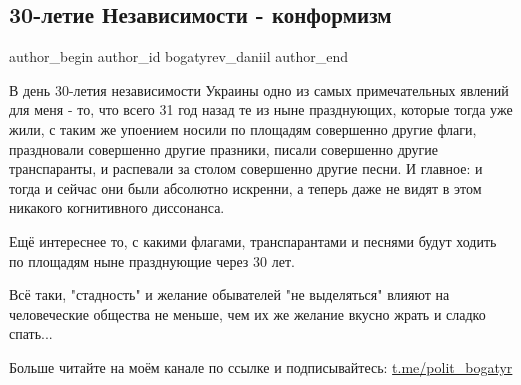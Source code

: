  
 
 
 
 
 
\subsection{30-летие Независимости - конформизм}
\label{sec:24_08_2021.fb.bogatyrev_daniil.1.konformizm_nezavisimost}
 
\ifcmt
 author_begin
   author_id bogatyrev_daniil
 author_end
\fi

В день 30-летия независимости Украины одно из самых примечательных явлений для
меня - то, что всего 31 год назад те из ныне празднующих, которые тогда уже
жили, с таким же упоением носили по площадям совершенно другие флаги,
праздновали совершенно другие празники, писали совершенно другие транспаранты,
и распевали за столом совершенно другие песни. И главное: и тогда и сейчас они
были абсолютно искренни, а теперь даже не видят в этом никакого когнитивного
диссонанса.

Ещё интереснее то, с какими флагами, транспарантами и песнями будут ходить по
площадям ныне празднующие через 30 лет.

Всё таки, "стадность" и желание обывателей "не выделяться" влияют на
человеческие общества не меньше, чем их же желание вкусно жрать и сладко
спать...

Больше читайте на моём канале по ссылке и подписывайтесь: \url{t.me/polit_bogatyr}

